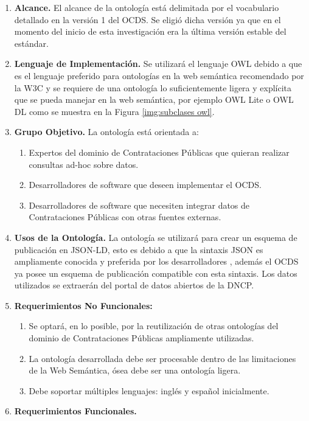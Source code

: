 \begin{enumerate}
\item \textbf{Alcance.} El alcance de la ontología está delimitada por el vocabulario detallado en la versión 1 del OCDS. Se eligió dicha versión ya que en el momento del inicio de esta investigación era la última versión estable del estándar.
\item \textbf{Lenguaje de Implementación.} Se utilizará el lenguaje OWL debido a que es el lenguaje preferido para ontologías en la web semántica recomendado por la W3C \cite{OWLSeman72:online} y se requiere de una ontología lo suficientemente ligera y explícita que se pueda manejar en la web semántica, por ejemplo OWL Lite o OWL DL como se muestra en la Figura \ref{img:subclases owl}.
\item \textbf{Grupo Objetivo. }La ontología está orientada a:
\begin{enumerate}
    \item Expertos del dominio de Contrataciones Públicas que quieran realizar consultas ad-hoc sobre datos.
    \item Desarrolladores de software que deseen implementar el OCDS.
    \item Desarrolladores de software que necesiten integrar datos de Contrataciones Públicas con otras fuentes externas. \end{enumerate}
\item \textbf{Usos de la Ontología.} La ontología se utilizará para crear un esquema de publicación en JSON-LD, esto es debido a que la sintaxis JSON es ampliamente conocida y preferida por los desarrolladores \cite{JSONLDSy39:online}, además el OCDS ya posee un esquema de publicación compatible con esta sintaxis. Los datos utilizados se extraerán del portal de datos abiertos de la DNCP.
\item \textbf{Requerimientos No Funcionales: }
\begin{enumerate}
    \item Se optará, en lo posible, por la reutilización de otras ontologías del dominio de Contrataciones Públicas ampliamente utilizadas.
    \item La ontología desarrollada debe ser procesable dentro de las limitaciones de la Web Semántica, ósea debe ser una ontología ligera.
    \item Debe soportar múltiples lenguajes: inglés y español inicialmente.
\end{enumerate}
\item \textbf{Requerimientos Funcionales. }
    \begin{enumerate}

\end{enumerate}
\end{enumerate}

